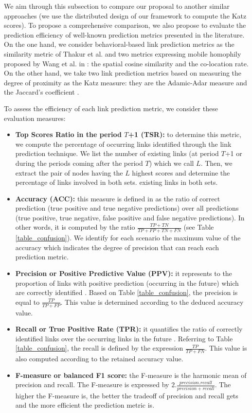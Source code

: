 \documentclass[conference]{IEEEtran}
\begin{document}
We aim through this subsection to compare our proposal to another
similar approaches (we use the distributed design of our framework
to compute the Katz scores). To propose a comprehensive comparison,
we also propose to evaluate the prediction efficiency of well-known
prediction metrics presented in the literature. On the one hand, we
consider behavioral-based link prediction metrics as the similarity
metric of Thakur et al. \cite{Thakur2010} and two metrics expressing
mobile homophily proposed by Wang et al. in \cite{Wang2011}: the
spatial cosine similarity and the co-location rate. On the other
hand, we take two link prediction metrics based on measuring the
degree of proximity as the Katz measure: they are the Adamic-Adar
measure \cite{Adamic2003} and the Jaccard's coefficient
\cite{Jaccard1901,Salton1986}.

To assess the efficiency of each link prediction metric, we consider
these evaluation measures:
\begin{itemize}
\item \textbf{Top Scores Ratio in the period $T$+1 (TSR):} to determine this metric, we compute
the percentage of occurring links identified through the link
prediction technique. We list the number of existing links (at
period $T$+1 or during the periods coming after the period $T$)
which we call $L$. Then, we extract the pair of nodes having the $L$
highest scores and determine the percentage of links involved in
both sets. existing links in both sets.
\item \textbf{Accuracy (ACC):} this measure is defined in \cite{FAWCETT2006} as
the ratio of correct prediction (true positive and true negative
predictions) over all predictions (true positive, true negative,
false positive and false negative predictions). In other words, it
is computed by the ratio $\frac{TP+TN}{TP+FP+TN+FN}$ (see Table
\ref{table_confusion}). We identify for each scenario the maximum
value of the accuracy which indicates the degree of precision that
can reach each prediction metric.
\item \textbf{Precision or Positive Predictive Value (PPV):}
it represents to the proportion of links with positive prediction
(occurring in the future) which are correctly identified
\cite{FAWCETT2006}. Based on Table \ref{table_confusion}, the
precision is equal to $\frac{TP}{TP+FP}$. This value is determined
according to the deduced accuracy value.
\item \textbf{Recall or True Positive Rate (TPR):} it quantifies
the ratio of correctly identified links over the occurring links in
the future \cite{FAWCETT2006}. Referring to Table
\ref{table_confusion}, the recall is defined by the expression
$\frac{TP}{TP+FN}$. This value is also computed according to the
retained accuracy value.
\item \textbf{F-measure or balanced F1 score:} the F-measure \cite{vanRijsbergen1979} is the harmonic mean of
precision and recall. The F-measure is expressed by
$2.\frac{precision.recall}{precision+recall}$. The higher the
F-measure is, the better the tradeoff of precision and recall gets
and the more efficient the prediction metric is.
\end{itemize}
\end{document}
